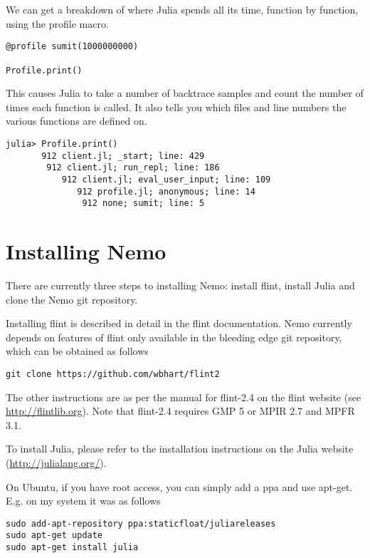 \documentclass[a4paper,10pt]{article}
\begin{document}
{We can get a breakdown of where Julia spends all its time, function by function,
using the profile macro.

\begin{lstlisting}
@profile sumit(1000000000)

Profile.print()
\end{lstlisting}

This causes Julia to take a number of backtrace samples and count the number of times
each function is called. It also tells you which files and line numbers the various
functions are defined on.

\begin{verbatim}
julia> Profile.print()
       912 client.jl; _start; line: 429
        912 client.jl; run_repl; line: 186
           912 client.jl; eval_user_input; line: 109
              912 profile.jl; anonymous; line: 14
               912 none; sumit; line: 5
\end{verbatim}

\section{Installing Nemo}

There are currently three steps to installing Nemo: install flint, install Julia and
clone the Nemo git repository.

Installing flint is described in detail in the flint documentation. Nemo currently
depends on features of flint only available in the bleeding edge git repository,
which can be obtained as follows

\begin{verbatim}
git clone https://github.com/wbhart/flint2
\end{verbatim}

The other instructions are as per the manual for flint-2.4 on the flint website (see
\url{http://flintlib.org}). Note that flint-2.4 requires GMP 5 or MPIR 2.7 and MPFR
3.1.

To install Julia, please refer to the installation instructions on the Julia website
(\url{http://julialang.org/}).

On Ubuntu, if you have root access, you can simply add a ppa and use apt-get. E.g. on
my system it was as follows

\begin{verbatim}
sudo add-apt-repository ppa:staticfloat/juliareleases
sudo apt-get update
sudo apt-get install julia
\end{verbatim}

}
\end{document}
